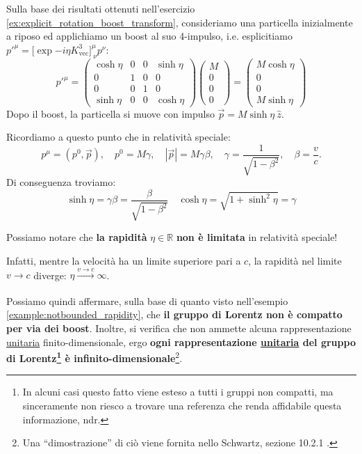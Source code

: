 \documentclass[../main.tex]{subfiles}
\begin{document}
\begin{example}
    Sulla base dei risultati ottenuti nell'esercizio \ref{ex:explicit_rotation_boost_transform}, consideriamo una particella inizialmente a riposo ed applichiamo un boost al suo 4-impulso, i.e. esplicitiamo \(p'^\mu =\big[\exp{-i\eta K^3_\text{vec}}\big]^\mu_{~\nu} p^\nu\):
    \[
        p'^\mu = 
        \begin{pmatrix}
            \cosh\eta   &   0   &   0   &   \sinh\eta\\
            0   &   1   &   0   &   0\\
            0   &   0   &   1   &   0\\
            \sinh\eta   &   0   &   0   &   \cosh\eta
        \end{pmatrix}
        \begin{pmatrix}
            M \\
            0 \\
            0 \\
            0
        \end{pmatrix}
        =
        \begin{pmatrix}
            M\cosh\eta \\
            0 \\
            0 \\
            M\sinh\eta
        \end{pmatrix}
    \]
    Dopo il boost, la particella si muove con impulso \(\Vec{p} = M\sinh\eta ~\hat z \).

    Ricordiamo a questo punto che in relatività speciale:
    \[
    p^\mu=(p^0, \Vec{p}),\quad p^0=M\gamma,\quad |\Vec{p}| = M\gamma \beta, \quad \gamma=\frac{1}{\sqrt{1-\beta^2}} , \quad \beta = \frac{v}{c}.
    \]
    Di conseguenza troviamo:
    \[
    \boxed{\sinh\eta = \gamma \beta = \frac{\beta}{\sqrt{1-\beta^2}} \quad \cosh\eta = \sqrt{1+\sinh^2\eta} = \gamma} 
    \]

    Possiamo notare che \textbf{la rapidità} $\eta\in \mathbb R$ \textbf{non è limitata} in relatività speciale!

    Infatti, mentre la velocità ha un limite superiore pari a $c$, la rapidità nel limite $v\rightarrow c$ diverge: \(\eta\xrightarrow[]{v\rightarrow c}\infty\). 
    \label{example:notbounded_rapidity}
\end{example}

Possiamo quindi affermare, sulla base di quanto visto nell'esempio \ref{example:notbounded_rapidity}, che \textbf{il gruppo di Lorentz non è compatto per via dei boost}. Inoltre, si verifica che non ammette alcuna rappresentazione \underline{unitaria} finito-dimensionale, ergo \textbf{ogni rappresentazione \underline{unitaria} del gruppo di Lorentz\footnote{In alcuni casi questo fatto viene esteso a tutti i gruppi non compatti, ma sinceramente non riesco a trovare una referenza che renda affidabile questa informazione, ndr.} è infinito-dimensionale}\footnote{Una “dimostrazione” di ciò viene fornita nello Schwartz, sezione 10.2.1 .}.
\end{document}
